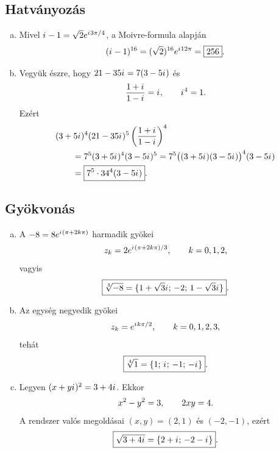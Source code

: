 \documentclass{szb-solution}
\begin{document}
\subsection{Hatványozás}

\begin{enumerate}[a)]
  \item Mivel ${i\mkern1mu}-1=\sqrt2e^{{i\mkern1mu}3\pi/4}$, a Moivre-formula alapján
        $$
          ({i\mkern1mu}-1)^{16}
          =(\sqrt2)^{16}e^{{i\mkern1mu}12\pi}
          =\boxed{256}
          \text.
        $$

  \item Vegyük észre, hogy $21-35{i\mkern1mu}=7(3-5{i\mkern1mu})$ és
        $$
          \frac{1+{i\mkern1mu}}{1-{i\mkern1mu}}={i\mkern1mu},
          \qquad {i\mkern1mu}^4=1
          \text.
        $$
        Ezért
        \begin{align*}
          &(3+5{i\mkern1mu})^4(21-35{i\mkern1mu})^5
          \left(\frac{1+{i\mkern1mu}}{1-{i\mkern1mu}}\right)^4
          \\
          &\qquad
          =7^5(3+5{i\mkern1mu})^4(3-5{i\mkern1mu})^5
          =7^5\bigl((3+5{i\mkern1mu})(3-5{i\mkern1mu})\bigr)^4(3-5{i\mkern1mu})
          \\
          &\qquad
          =\boxed{7^5\cdot34^4(3-5{i\mkern1mu})}
          \text.
        \end{align*}
\end{enumerate}

\subsection{Gyökvonás}

\begin{enumerate}[a)]
  \item A $-8=8e^{{i\mkern1mu}(\pi+2k\pi)}$ harmadik gyökei
        $$
          z_k=2e^{{i\mkern1mu}(\pi+2k\pi)/3},
          \qquad k=0,1,2
          \text,
        $$
        vagyis
        $$
          \boxed{\sqrt[3]{-8}=\{1+\sqrt3{i\mkern1mu};\,-2;\,1-\sqrt3{i\mkern1mu}\}}
          \text.
        $$

  \item Az egység negyedik gyökei
        $$
          z_k=e^{{i\mkern1mu} k\pi/2},
          \qquad k=0,1,2,3
          \text,
        $$
        tehát
        $$
          \boxed{\sqrt[4]{1}=\{1;\,{i\mkern1mu};\,-1;\,-{i\mkern1mu}\}}
          \text.
        $$

  \item Legyen $(x+y{i\mkern1mu})^2=3+4{i\mkern1mu}$. Ekkor
        $$
          x^2-y^2=3,
          \qquad 2xy=4
          \text.
        $$
        A rendszer valós megoldásai $(x,y)=(2,1)$ és $(-2,-1)$, ezért
        $$
          \boxed{\sqrt{3+4{i\mkern1mu}}=\{2+{i\mkern1mu};\,-2-{i\mkern1mu}\}}
          \text.
        $$
\end{enumerate}
\end{document}

